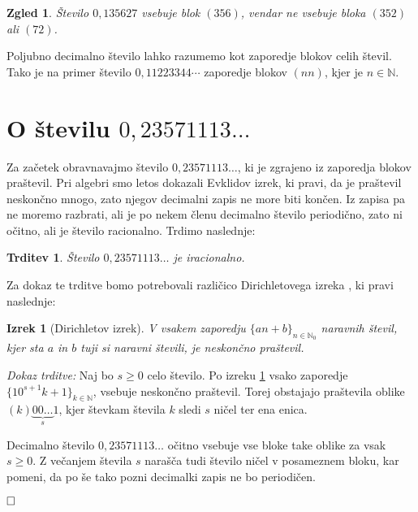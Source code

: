 \documentclass[a4paper,12pt]{article}
\def\N{\mathbb{N}} %
\def\qed{$\hfill\Box$}   %
\newtheorem{izrek}{Izrek}
\newtheorem{trditev}{Trditev}
\newtheorem{zgled}{Zgled}
\begin{document}
\begin{zgled}
    Število $0,135627$ vsebuje blok $(356)$, vendar ne vsebuje bloka $(352)$ ali $(72)$.
\end{zgled}

Poljubno decimalno število lahko razumemo kot zaporedje blokov celih števil.
Tako je na primer število $0,11223344 \cdots$ zaporedje blokov $(nn)$,
kjer je $n \in \N$.


\section{O številu $0,23571113 \dots$}

Za začetek obravnavajmo število $0,23571113 \dots$, ki je zgrajeno iz zaporedja
blokov praštevil. 
Pri algebri smo letos dokazali Evklidov izrek, ki pravi, da je praštevil neskončno mnogo,
zato njegov decimalni zapis ne more biti končen. 
Iz zapisa pa ne moremo razbrati, ali 
je po nekem členu decimalno število periodično, zato ni očitno, ali je število racionalno.
Trdimo naslednje:

\begin{trditev}
    \label{trditev praštevila}
    Število $0,23571113 \dots$ je iracionalno.
\end{trditev}

Za dokaz te trditve bomo potrebovali različico Dirichletovega izreka \cite{Vog}, ki pravi naslednje:

\begin{izrek}[Dirichletov izrek]
    \label{Dirichletov izrek}
    V vsakem zaporedju $ \lbrace an + b \rbrace_{n \in \N_0}$ naravnih števil, kjer sta $a$ in $b$
    tuji si naravni števili, je neskončno praštevil.
\end{izrek}

\noindent
{\em Dokaz trditve:\/} Naj bo $s \geq 0$ celo število. 
Po izreku \ref{Dirichletov izrek} vsako zaporedje
$ \{10^{s+1}k + 1\}_{k \in \N}$,  vsebuje neskončno praštevil. Torej obstajajo praštevila
oblike $(k)\underbrace{00 \dots}_{s}1$, kjer števkam števila $k$ sledi $s$ ničel ter ena enica. 

Decimalno število $0,23571113\dots$ očitno vsebuje vse bloke take oblike za vsak $s \geq 0$. Z večanjem števila
$s$ narašča tudi število ničel v posameznem bloku, kar pomeni, da po še tako pozni decimalki zapis ne bo periodičen.

\qed
\end{document}
